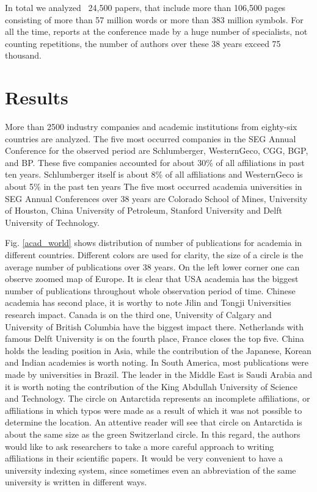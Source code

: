 \documentclass[geosciences,article,submit,moreauthors,pdftex]{Definitions/mdpi}
\begin{document}
In total we analyzed ~24,500 papers, that include more than 106,500 pages consisting of more than 57 million words or more than 383 million symbols. For all the time, reports at the conference made by a huge number of specialists, not counting repetitions, the number of authors over these 38 years exceed 75 thousand. 

 
\section{Results}

More than 2500 industry companies and academic institutions from eighty-six countries are analyzed. The  five most occurred companies in the SEG Annual Conference for the observed period are Schlumberger, WesternGeco, CGG, BGP, and BP. These five companies accounted for about 30\% of all affiliations in past ten years. Schlumberger itself is about 8\% of all affiliations and WesternGeco is about 5\% in the past ten years  The five most occurred academia universities in SEG Annual Conferences over 38 years are Colorado School of Mines, University of Houston, China University of Petroleum, Stanford University and Delft University of Technology. 

Fig. \ref{acad_world} shows distribution of number of publications for academia in different countries. Different colors are used for clarity, the size of a circle is the average number of publications over 38 years.  On the left lower corner one can observe zoomed map of Europe. It is clear that USA academia has the biggest number of publications throughout whole observation period of time. Chinese academia has second place, it is worthy to note Jilin and Tongji Universities research impact. Canada is on the third one, University of Calgary and University of British Columbia have the biggest impact there. Netherlands with famous Delft University is on the fourth place, France closes the top five. China holds the leading position in Asia, while the contribution of the Japanese, Korean and Indian academies is worth noting. In South America, most publications were made by universities in Brazil. The leader in the Middle East is Saudi Arabia and it is worth noting the contribution of the King Abdullah University of Science and Technology. The circle on Antarctida represents an incomplete affiliations, or affiliations in which typos were made as a result of which it was not possible to determine the location. An attentive reader will see that circle on Antarctida is about the same size as the green Switzerland circle. In this regard, the authors would like to ask researchers to take a more careful approach to writing affiliations in their scientific papers. It would be very convenient to have a university indexing system, since sometimes even an abbreviation of the same university is written in different ways.
\end{document}
